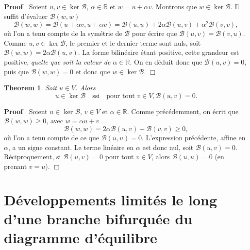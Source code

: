 \documentclass{article}
\newcommand{\tmem}[1]{{\em #1\/}}
\newenvironment{proof}{\noindent\textbf{Proof\ }}{\hspace*{\fill}$\Box$\medskip}
\newtheorem{theorem}{Theorem}
\begin{document}
\begin{proof}
  Soient $u, v \in \ker \mathcal{B}$, $\alpha \in \mathbb{R}$ et $w = u +
  \alpha v$. Montrons que $w \in \ker \mathcal{B}$. Il suffit d'évaluer
  $\mathcal{B} (w, w)$
  \begin{equation}
    \mathcal{B} (w, w) =\mathcal{B} (u + \alpha v, u + \alpha v) =\mathcal{B}
    (u, u) + 2 \alpha \mathcal{B} (u, v) + \alpha^2 \mathcal{B} (v, v),
  \end{equation}
  où l'on a tenu compte de la symétrie de $\mathcal{B}$ pour
  écrire que $\mathcal{B} (u, v) =\mathcal{B} (v, u)$. Comme $u, v \in
  \ker \mathcal{B}$, le premier et le dernier terme sont nuls, soit
  $\mathcal{B} (w, w) = 2 \alpha \mathcal{B} (u, v)$. La forme bilinéaire
  étant positive, cette grandeur est positive, {\tmem{quelle que soit la
  valeur de $\alpha \in \mathbb{R}$}}. On en déduit donc que $\mathcal{B}
  (u, v) = 0$, puis que $\mathcal{B} (w, w) = 0$ et donc que $w \in \ker
  \mathcal{B}.$
\end{proof}

\begin{theorem}
  Soit $u \in V$. Alors
  \begin{equation}
    u \in \ker \mathcal{B} \quad \text{ssi} \quad \text{pour tout } v \in V,
    \mathcal{B} (u, v) = 0.
  \end{equation}
\end{theorem}

\begin{proof}
  Soient $u \in \ker \mathcal{B}$, $v \in V$ et $\alpha \in \mathbb{R}$. Comme
  précédemment, on écrit que $\mathcal{B} (w, w) \geq 0$, avec $w
  = \alpha u + v$
  \begin{equation}
    \mathcal{B} (w, w) = 2 \alpha \mathcal{B} (u, v) +\mathcal{B} (v, v) \geq
    0,
  \end{equation}
  où l'on a tenu compte de ce que $\mathcal{B} (u, u) = 0$. L'expression
  précédente, affine en $\alpha$, a un signe constant. Le terme
  linéaire en $\alpha$ est donc nul, soit $\mathcal{B} (u, v) = 0$.
  Réciproquement, si $\mathcal{B} (u, v) = 0$ pour tout $v \in V$, alors
  $\mathcal{B} (u, u) = 0$ (en prenant $v = u$).
\end{proof}

\section{Développements limités le long d'une branche bifurquée du
diagramme d'équilibre}
\end{document}
